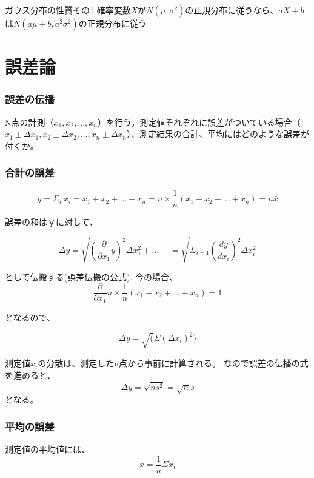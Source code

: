 \documentclass[a4paper,uplatex]{jsreport}
\begin{document}
\begin{itembox}[l]{ガウス分布の性質その1}
  確率変数$X$が$N(\mu,\sigma^2)$の正規分布に従うなら、$aX+b$は$N(a\mu+b,a^2\sigma^2)$の正規分布に従う
\end{itembox}




\section{誤差論}
\subsubsection{誤差の伝播}
N点の計測（$x_1, x_2, ..., x_n$）を行う。測定値それぞれに誤差がついている場合（$x_1\pm\Delta x_1, x_2\pm\Delta x_2, ..., x_n\pm\Delta x_n$）、測定結果の合計、平均にはどのような誤差が付くか。

\subsubsection{合計の誤差}

\begin{equation}
  y=\Sigma_i~x_i=x_1+x_2+...+x_n=n\times\frac{1}{n}(x_1+x_2+...+x_n)=n\bar{x}
\end{equation}

誤差の和はｙに対して、

\begin{equation}
  \Delta y = \sqrt{\left(\frac{\partial}{\partial x_1}y \right)^2 \Delta x_1^2 + ... + } = \sqrt{\Sigma_{i=1}\left(\frac{dy}{dx_i}\right)^2\Delta x_i^2}
\end{equation}

として伝搬する(誤差伝搬の公式).
今の場合、
\begin{equation}
  \frac{\partial}{\partial x_1}n\times \frac{1}{n}(x_1+x_2+...+x_n)=1
\end{equation}

となるので、

\begin{equation}
  \Delta y=\sqrt(\Sigma(\Delta x_i)^2)
\end{equation}

測定値$x_{i}$の分散は、測定したn点から事前に計算される。
なので誤差の伝播の式を進めると、
\begin{equation}
  \Delta y=\sqrt{ns^2}=\sqrt{n}s
\end{equation}
となる。

\subsubsection{平均の誤差}
測定値の平均値には、
\begin{equation}
  \bar{x}=\frac{1}{n}\Sigma x_i
\end{equation}
\end{document}

